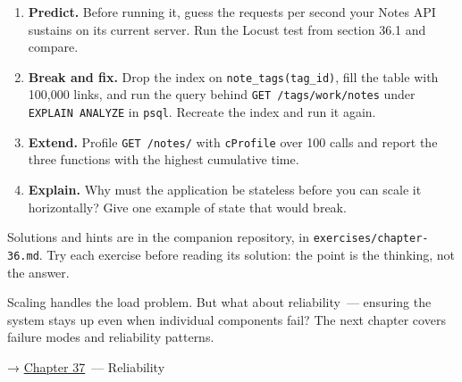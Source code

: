 \label{36-scaling-load:exercises}

\begin{enumerate}
\def\labelenumi{\arabic{enumi}.}
\tightlist
\item
  \textbf{Predict.} Before running it, guess the requests per second your Notes API sustains on its current server. Run the Locust test from section 36.1 and compare.
\item
  \textbf{Break and fix.} Drop the index on \texttt{note\_tags(tag\_id)}, fill the table with 100,000 links, and run the query behind \texttt{GET\ /}\allowbreak{}\texttt{tags/}\allowbreak{}\texttt{work/}\allowbreak{}\texttt{notes} under \texttt{EXPLAIN\ ANALYZE} in \texttt{psql}. Recreate the index and run it again.
\item
  \textbf{Extend.} Profile \texttt{GET\ /notes/} with \texttt{cProfile} over 100 calls and report the three functions with the highest cumulative time.
\item
  \textbf{Explain.} Why must the application be stateless before you can scale it horizontally? Give one example of state that would break.
\end{enumerate}

\noindent{}Solutions and hints are in the companion repository, in \texttt{exercises/}\allowbreak{}\texttt{chapter-36.md}. Try each exercise before reading its solution: the point is the thinking, not the answer.

\label{36-scaling-load:whats-next}

Scaling handles the load problem. But what about reliability~--- ensuring the system stays up even when individual components fail? The next chapter covers failure modes and reliability patterns.

\noindent{}→ \hyperref[ch:37-reliability]{Chapter 37}~--- Reliability
